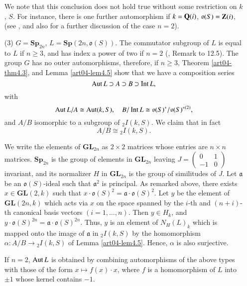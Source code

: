 \begin{examples}
\begin{itemize}
We note that this conclusion does not hold true without some restriction on $k$, $S$. For instance, there is one further automorphism if $k=\mathbf{Q}(i)$, $\mathfrak{o}(S)=\mathbf{Z}(i)$, (see \cite{art04-key20}, and also \cite{art04-key21} for a further discussion of the case $n=2$).

\item[(3)] $G=\mathbf{Sp}_{2n}$, $L=\mathbf{Sp}(2n,\mathfrak{o}(S))$. The commutator subgroup of $L$ is equal to $L$ if $n\geq 3$, and has index a power of two if $n=2$ (\cite{art04-key3}, Remark to 12.5). The group $G$ has no outer automorphisms, therefore, if $n\geq 3$, Theorem \ref{art04-thm4.3}, and Lemma \ref{art04-lem4.5} show that we have a composition series
$$
\operatorname{\mathrm{Aut}} L\supset A\supset B\supset \operatorname{\mathrm{Int}} L,
$$
with
$$
\operatorname{\mathrm{Aut}} L/A\cong \operatorname{\mathrm{Aut}} (k,S),\quad B/\operatorname{\mathrm{Int}} L\cong\mathfrak{o}(S)^{*}/\mathfrak{o}(S)^{*(2)},
$$
and $A/B$ isomorphic to a subgroup of ${}_{2}I(k,S)$. We claim that in fact
$$
A/B\cong {}_{2}I(k,S).
$$

We write the elements of $\mathbf{GL}_{2n}$ as $2\times 2$ matrices whose entries are $n\times n$ matrices. $\mathbf{Sp}_{2n}$ is the group of elements in $\mathbf{GL}_{2n}$ leaving $J=\left(\begin{smallmatrix} 0 & 1\\ -1 & 0\end{smallmatrix}\right)$ invariant, and its normalizer $H$ in $\mathbf{GL}_{2n}$ is the group of similitudes of $J$. Let $\mathfrak{a}$ be an $\mathfrak{o}(S)$-ideal such that $\mathfrak{a}^{2}$ is principal. As remarked above, there exists $x\in \mathbf{GL}(2,k)$ such that $x\cdot \mathfrak{o}(S)^{2}=\mathfrak{a}\cdot \mathfrak{o}(S)^{2}$. Let $y$ be the element of $\mathbf{GL}(2n,k)$ which acts via $x$ on the space spanned by the $i$-th and $(n+i)$-th canonical basis vectors $(i=1,\ldots,n)$. Then $y\in H_{k}$, and $y\cdot \mathfrak{o}(S)^{2n}=\mathfrak{a}\cdot \mathfrak{o}(S)^{2n}$. Thus, $y$ is an element of $N_{H}(L)_{k}$ which is mapped onto the image of $\mathfrak{a}$ in ${}_{2}I(k,S)$ by the homomorphism $\alpha:A/B\to {}_{2}I(k,S)$ of Lemma \ref{art04-lem4.5}. Hence, $\alpha$ is also surjective.

If $n=2$, $\operatorname{\mathrm{Aut}} L$ is obtained by combining automorphisms of the above types with those of the form $x\mapsto f(x)\cdot x$, where $f$ is a homomorphism of $L$ into $\pm 1$ whose kernel contains $-1$.
\end{itemize}
\end{examples}

